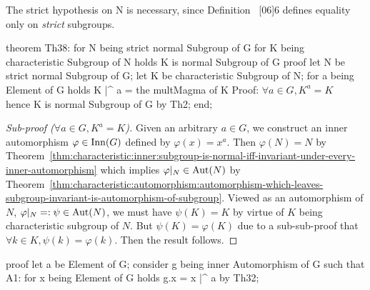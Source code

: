 \begin{thm-remark}
The {\Tt{}strict\nwendquote} hypothesis on {\Tt{}N\nwendquote} is necessary, since Definition~%
[06]{6} defines equality only on \emph{strict} subgroups.
\end{thm-remark}

\nwenddocs{}\endmoddef\nwstartdeflinemarkup{}\nwenddeflinemarkup
theorem Th38:
  for N being strict normal Subgroup of G
  for K being characteristic Subgroup of N
  holds K is normal Subgroup of G
proof
  let N be strict normal Subgroup of G;
  let K be characteristic Subgroup of N;
  for a being Element of G holds K |^ a = the multMagma of K
  \LA{}Proof: $\forall a\in G, K^{a}=K$~{\nwtagstyle{}}\RA{}
  hence K is normal Subgroup of G by Th2;
end;
\eatline
{}\nwendcode{}\nwdocspar
\begin{proof}[Sub-proof ($\forall a\in G, K^{a}=K$)]
Given an arbitrary $a\in G$, we construct an inner automorphism
$\varphi\in\operatorname{Inn}(G)$ defined by $\varphi(x)=x^{a}$. Then $\varphi(N)=N$
by Theorem~\ref{thm:characteristic:inner:subgroup-is-normal-iff-invariant-under-every-inner-automorphism}
which implies $\varphi|_{N}\in\operatorname{Aut}(N)$ by Theorem~\ref{thm:characteristic:automorphism:automorphism-which-leaves-subgroup-invariant-is-automorphism-of-subgroup}.
Viewed
as an automorphism of $N$, $\varphi|_{N}=:\psi\in\operatorname{Aut}(N)$, we must have
$\psi(K)=K$ by virtue of $K$ being characteristic subgroup of $N$. But
$\psi(K)=\varphi(K)$ due to a sub-sub-proof that $\forall k\in K,\psi(k)=\varphi(k)$.
Then the result follows.
\end{proof}

\nwenddocs{}\endmoddef\nwstartdeflinemarkup{}\nwenddeflinemarkup
proof
  let a be Element of G;
  consider g being inner Automorphism of G such that
  A1: for x being Element of G holds g.x = x |^ a
  by Th32;

